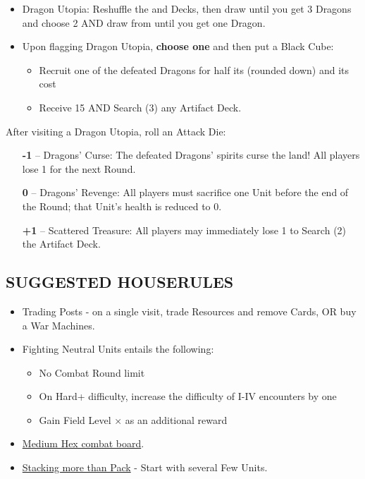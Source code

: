 \begin{multicols*}{2}
\begin{itemize}
  \item Dragon Utopia: Reshuffle the  and  Decks, then draw  until you get 3 Dragons and choose 2 AND draw from  until you get one Dragon. 
  \item Upon flagging Dragon Utopia, \textbf{choose one} and then put a Black Cube:
  \begin{itemize}
    \item Recruit one of the defeated Dragons for half its  (rounded down) and its  cost
    \item Receive 15  AND Search (3) any Artifact Deck.
  \end{itemize}
\end{itemize}

After visiting a Dragon Utopia, roll an Attack Die:
\begin{itemize}
  \item[\textbf{-1}] -- Dragons' Curse: The defeated Dragons’ spirits curse the land! All players lose 1  for the next Round.
  \item[\textbf{0}] -- Dragons' Revenge: All players must sacrifice one Unit before the end of the Round; that Unit's health is reduced to 0. 
  \item[ \textbf{+1}] -- Scattered Treasure: All players may immediately lose 1  to Search (2) the Artifact Deck.
\end{itemize}

\subsection*{\MakeUppercase{Suggested Houserules}}
\begin{itemize}
  \item Trading Posts - on a single visit, trade Resources and remove Cards, OR buy a War Machines.
  \item Fighting Neutral Units entails the following:
  \begin{itemize}
    \item No Combat Round limit
    \item On Hard+ difficulty, increase the difficulty of I-IV encounters by one
    \item Gain Field Level ×  as an additional reward
  \end{itemize}
  \item \href{https://boardgamegeek.com/thread/3445901/custom-hex-combat-board}{Medium Hex combat board}.
  \item \href{https://boardgamegeek.com/thread/3449937/houserule-for-stacking-more-than-pack}{Stacking more than Pack} - Start with several Few  Units.
\end{itemize}

\vspace*{\fill}

\end{multicols*}

